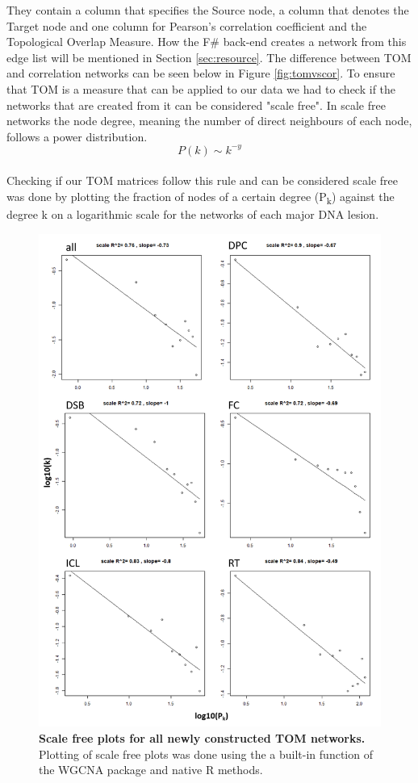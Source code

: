They contain a column that specifies the Source node, a column that denotes the Target node and one column for Pearson's correlation coefficient and the Topological Overlap Measure. How the F\# back-end creates a network from this edge list will be mentioned in Section \ref{sec:resource}. The difference between TOM and correlation networks can be seen below in Figure \ref{fig:tomvscor}. To ensure that TOM is a measure that can be applied to our data we had to check if the networks that are created from it can be considered "scale free". In scale free networks the node degree, meaning the number of direct neighbours of each node, follows a power distribution.
\begin{equation}
    P(k) \sim k^{-y}
\end{equation}\\
Checking if our TOM matrices follow this rule and can be considered scale free was done by plotting the fraction of nodes of a certain degree (P\textsubscript{k}) against the degree k on a logarithmic scale for the networks of each major DNA lesion.
\begin{figure}[H]
    \centering
    \includegraphics[width=\textwidth]{resources/images/Results/scaleFreePage.png}
    \caption[Scale free plots for all newly constructed TOM networks]{\textbf{Scale free plots for all newly constructed TOM networks. }Plotting of scale free plots was done using the a built-in function of the WGCNA package and native R methods.}
    \label{fig:scaleFreeness}
\end{figure}
